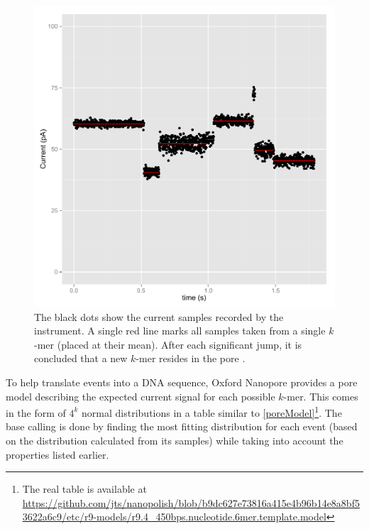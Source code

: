 \documentclass[times, utf, seminar]{fer}
\begin{document}
\begin{figure}[H]
	\begin{mdframed}[roundcorner=7pt]                                
	\centerline{\includegraphics[scale=0.8, clip]{simulation.pdf}}%
	\caption{The black dots show the current samples recorded by the instrument. A single
	red line marks all samples taken from a single $k$-mer (placed at their mean). After each significant jump, it is concluded that a new $k$-mer resides in the pore \citep{simpson}.}
	\label{sampling}
	\end{mdframed}                                                  
\end{figure}  

To help translate events into a DNA sequence, Oxford Nanopore provides a pore model describing the expected current signal for each possible $k$-mer. This comes in the form of $4^k$ normal distributions in a table similar to \ref{poreModel}\footnote{The real table is available at \url{https://github.com/jts/nanopolish/blob/b9dc627e73816a415e4b96b14e8a8bf53622a6c9/etc/r9-models/r9.4_450bps.nucleotide.6mer.template.model}}. The base calling is done by finding the most fitting distribution for each event (based on the distribution calculated from its samples) while taking into account the properties listed earlier.
\end{document}
